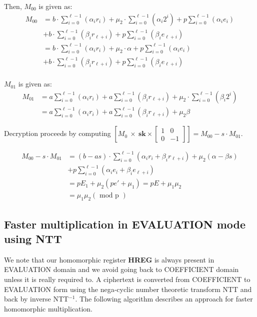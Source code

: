 \documentclass[10pt,journal,compsoc]{IEEEtran}
\theoremstyle{definition}
\begin{document}
 

Then, $M_{00}$ is given as:
 \begin{align*}
   M_{00} &= b\cdot\sum_{i=0}^{\ell-1}\left(\alpha_ir_i\right)+ \mu_2\cdot\sum_{i=0}^{\ell-1}\left(\alpha_i2^i\right)+p\sum_{i=0}^{\ell-1}\left(\alpha_ie_i\right)\\ 
   &+b\cdot\sum_{i=0}^{\ell-1}\left(\beta_ir_{\ell+i}\right)+p\sum_{i=0}^{\ell-1}\left(\beta_ie_{\ell+i}\right)
   \\
   &= b\cdot\sum_{i=0}^{\ell-1}\left(\alpha_ir_i\right)+ \mu_2\cdot\alpha+p\sum_{i=0}^{\ell-1}\left(\alpha_ie_i\right)\\ 
   &+b\cdot\sum_{i=0}^{\ell-1}\left(\beta_ir_{\ell+i}\right)+p\sum_{i=0}^{\ell-1}\left(\beta_ie_{\ell+i}\right)\\
  \end{align*}
  
  $M_{01}$ is given as:
 \begin{align*}
   M_{01} & = a\sum_{i=0}^{\ell-1}\left(\alpha_ir_i \right) + a\sum_{i=0}^{\ell-1}\left(\beta_ir_{\ell+i} \right) + \mu_2\cdot\sum_{i=0}^{\ell-1}\left(\beta_i2^i \right)
   \\
   &=  a\sum_{i=0}^{\ell-1}\left(\alpha_ir_i \right) + a\sum_{i=0}^{\ell-1}\left(\beta_ir_{\ell+i} \right) + \mu_2\beta
  \end{align*}

Decryption proceeds by computing $\left[M_{0} \ \times \ \textbf{sk} \times
\left[ 
\begin{smallmatrix} 
1 & 0\\
0 & -1  
\end{smallmatrix}
\right]
\right] = M_{00}-s\cdot M_{01}.
$

\begin{align*}
  M_{00}-s\cdot M_{01} &= \left(b-as\right)\cdot\sum_{i=0}^{\ell-1}\left( \alpha_ir_i+\beta_ir_{\ell+i}\right)+\mu_2\left(\alpha-\beta s\right)\\
  &+ p\sum_{i=0}^{\ell-1}\left(\alpha_ie_i + \beta_ie_{\ell+i} \right)\\
  &=pE_1 + \mu_2\left(pe'+\mu_1\right) = pE + \mu_1\mu_2\\
  &= \mu_1\mu_2 \left( \text{ mod p }\right)
 \end{align*}
 
\subsection{Faster multiplication in EVALUATION mode using NTT}
We note that our homomorphic register \textbf{HREG} is always present in EVALUATION domain and we avoid going back to COEFFICIENT domain unless it is really required to. A ciphertext is converted from COEFFICIENT to EVALUATION form using the nega-cyclic number theoretic transform NTT and back by inverse NTT$^{-1}$. The following algorithm describes an approach for faster homomorphic multiplication.
 
\end{document}
